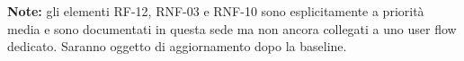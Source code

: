 \begin{longtable}{p{1.2cm} p{2.2cm} p{2.2cm} p{3.4cm} p{2.6cm} p{4cm}}
\bottomrule
\end{longtable}

\textbf{Note:} gli elementi RF-12, RNF-03 e RNF-10 sono esplicitamente a priorità media e sono documentati in questa sede ma non ancora collegati a uno user flow dedicato. Saranno oggetto di aggiornamento dopo la baseline.
